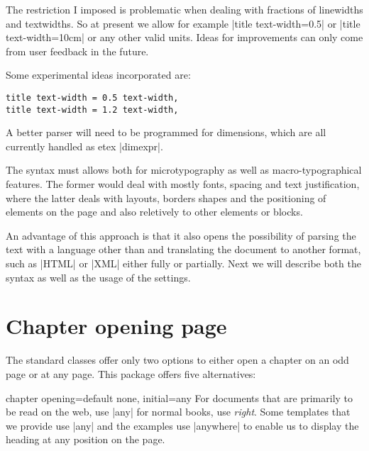 The restriction I imposed is problematic when dealing with fractions of linewidths and textwidths. So
at present we allow for example |title text-width=0.5\texwidth| or |title text-width=10cm| or any other valid units. Ideas for improvements can only come from user feedback in the future.

Some experimental ideas incorporated are:

\begin{verbatim}
title text-width = 0.5 text-width,
title text-width = 1.2 text-width,
\end{verbatim}

A better parser will need to be programmed for dimensions, which are all currently handled as etex |dimexpr|. 

The syntax must allows both for microtypography as well as macro-typographical features. The former would deal with mostly fonts, spacing and text justification, where the latter deals with layouts, borders shapes and the positioning of elements on the page and also reletively to other elements or blocks.

An advantage of this approach is that it also opens the possibility of parsing the text with a language other than \tex and translating the document to another format, such as |HTML| or |XML| either fully or partially. Next we will describe both the syntax as well as the usage of the settings.

\section{Chapter opening page}

The standard \latexe classes offer only two options to either open a chapter on an odd page or at any page. This package offers five alternatives:

\begin{docKey}[phd]{chapter opening}{=}{default none, initial=any}
For documents that are primarily to be read on the web, use |any| for normal books, use \textit{right}. Some templates that we provide use |any| and the examples use |anywhere| to enable us to display the heading at any position on the page.
\end{docKey}

